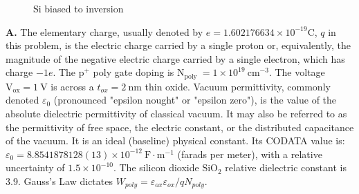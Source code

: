 \documentclass[main.tex]{subfiles}
\begin{document}
\begin{enumerate}
\begin{enumerate}
        \begin{figure}
        \centering{}
        \caption{Si biased to inversion}
        \label{fig:17ac_b}
        \end{figure}
        
        \textbf{A.} The elementary charge, usually denoted by $e = 1.602176634 \times 10^{-19} \mathrm{C}$, $q$ in this problem, is the electric charge carried by a single proton or, equivalently, the magnitude of the negative electric charge carried by a single electron, which has charge $-1 e$. The $\mathrm{p}^{+}$ poly gate doping is $\mathrm{N}_{\text {poly }}=1 \times 10^{19} \mathrm{~cm}^{-3}$. The voltage $\mathrm{V}_{\mathrm{ox}} = \qty{1}{\volt}$ is across a $t_{ox} = \qty{2}{\nano\meter}$ thin  oxide. Vacuum permittivity, commonly denoted $\varepsilon_0$ (pronounced "epsilon nought" or "epsilon zero"), is the value of the absolute dielectric permittivity of classical vacuum. It may also be referred to as the permittivity of free space, the electric constant, or the distributed capacitance of the vacuum. It is an ideal (baseline) physical constant. Its CODATA value is: $\varepsilon_0=8.8541878128(13) \times 10^{-12} \mathrm{~F} \cdot \mathrm{m}^{-1}$ (farads per meter), with a relative uncertainty of $1.5 \times 10^{-10}$. The silicon dioxide $\mathrm{SiO}_2$ relative dielectric constant is 3.9. Gauss's Law dictates $W_{poly}=\varepsilon_{ox} {\varepsilon_{ox}} / q N_{poly}$.


\end{enumerate}
\end{enumerate}
\end{document}
